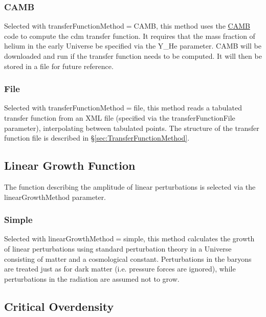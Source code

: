 \subsubsection{{\normalfont \scshape CAMB}}\label{sec:TransferFunction:CAMB}

Selected with {\normalfont \ttfamily transferFunctionMethod}$=${\normalfont \ttfamily CAMB}, this method uses the \href{http://camb.info/}{\normalfont \scshape CAMB} code to compute the \gls{cdm} transfer function. It requires that the mass fraction of helium in the early Universe be specified via the {\normalfont \ttfamily Y\_He} parameter. {\normalfont \scshape CAMB} will be downloaded and run if the transfer function needs to be computed. It will then be stored in a file for future reference.

\subsubsection{File}

Selected with {\normalfont \ttfamily transferFunctionMethod}$=${\normalfont \ttfamily file}, this method reads a tabulated transfer function from an XML file (specified via the {\normalfont \ttfamily transferFunctionFile} parameter), interpolating between tabulated points. The structure of the transfer function file is described in \S\ref{sec:TransferFunctionMethod}.

\subsection{Linear Growth Function}

The function describing the amplitude of linear perturbations is selected via the {\normalfont \ttfamily linearGrowthMethod} parameter.

\subsubsection{Simple}

Selected with {\normalfont \ttfamily linearGrowthMethod}$=${\normalfont \ttfamily simple}, this method calculates the growth of linear perturbations using standard perturbation theory in a Universe consisting of matter and a cosmological constant. Perturbations in the baryons are treated just as for dark matter (i.e. pressure forces are ignored), while perturbations in the radiation are assumed not to grow.

\subsection{Critical Overdensity}\label{sec:criticalOverdensityMethod}

